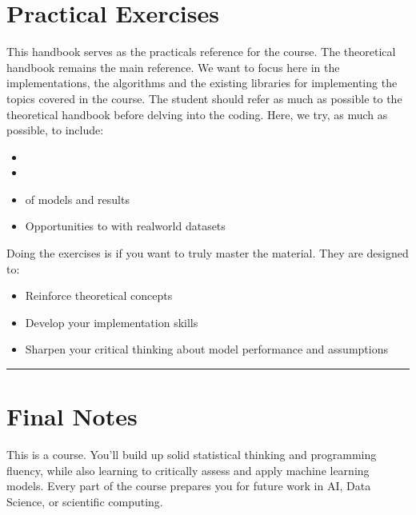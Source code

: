 \documentclass[letterpaper,10pt,english]{jupyterBook}
\begin{document}
\section{Practical Exercises}
\label{\detokenize{introduction:practical-exercises}}
\sphinxAtStartPar
This handbook serves as the practicals reference for the course. The theoretical handbook remains the main reference. We want to focus here in the implementations, the algorithms and the existing libraries for implementing the topics covered in the course. The student should refer as much as possible to the theoretical handbook before delving into the coding. Here, we try, as much as possible, to include:
\begin{itemize}
\item {} 
\sphinxAtStartPar
{}

\item {} 
\sphinxAtStartPar
{}

\item {} 
\sphinxAtStartPar
{} of models and results

\item {} 
\sphinxAtStartPar
Opportunities to  with real\sphinxhyphen{}world datasets

\end{itemize}

\sphinxAtStartPar
Doing the exercises is  if you want to truly master the material. They are designed to:
\begin{itemize}
\item {} 
\sphinxAtStartPar
Reinforce theoretical concepts

\item {} 
\sphinxAtStartPar
Develop your implementation skills

\item {} 
\sphinxAtStartPar
Sharpen your critical thinking about model performance and assumptions

\end{itemize}


\bigskip\hrule\bigskip



\section{Final Notes}
\label{\detokenize{introduction:final-notes}}
\sphinxAtStartPar
This is a  course. You’ll build up solid statistical thinking and programming fluency, while also learning to critically assess and apply machine learning models. Every part of the course prepares you for future work in AI, Data Science, or scientific computing.
\end{document}
